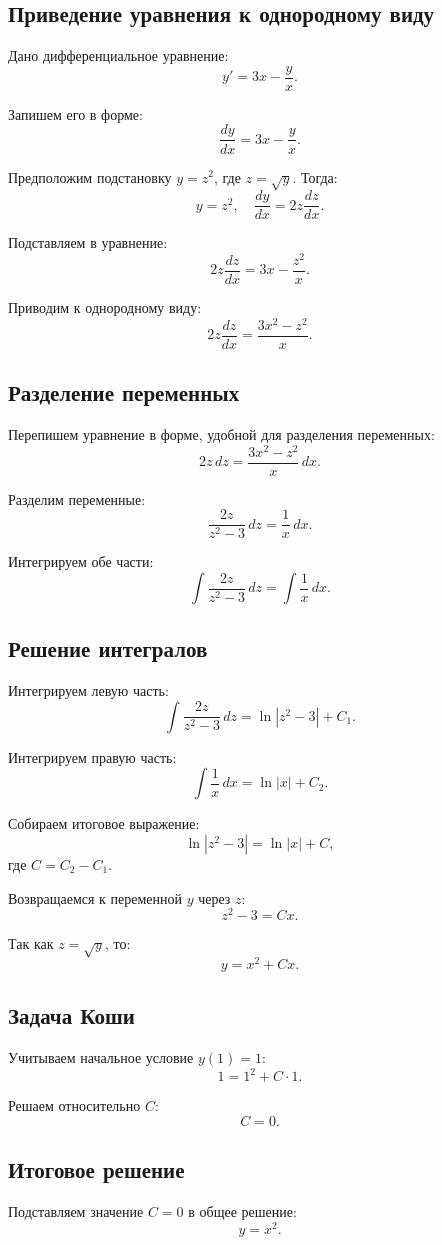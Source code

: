 \documentclass[a4paper,12pt]{article}
\begin{document}
\subsection*{Приведение уравнения к однородному виду}
Дано дифференциальное уравнение:
\[
y' = 3x - \frac{y}{x}.
\]

Запишем его в форме:
\[
\frac{dy}{dx} = 3x - \frac{y}{x}.
\]

Предположим подстановку \( y = z^2 \), где \( z = \sqrt{y} \). Тогда:
\[
y = z^2, \quad \frac{dy}{dx} = 2z \frac{dz}{dx}.
\]

Подставляем в уравнение:
\[
2z \frac{dz}{dx} = 3x - \frac{z^2}{x}.
\]

Приводим к однородному виду:
\[
2z \frac{dz}{dx} = \frac{3x^2 - z^2}{x}.
\]

\subsection*{Разделение переменных}
Перепишем уравнение в форме, удобной для разделения переменных:
\[
2z \, dz = \frac{3x^2 - z^2}{x} \, dx.
\]

Разделим переменные:
\[
\frac{2z}{z^2 - 3} \, dz = \frac{1}{x} \, dx.
\]

Интегрируем обе части:
\[
\int \frac{2z}{z^2 - 3} \, dz = \int \frac{1}{x} \, dx.
\]

\subsection*{Решение интегралов}
Интегрируем левую часть:
\[
\int \frac{2z}{z^2 - 3} \, dz = \ln|z^2 - 3| + C_1.
\]

Интегрируем правую часть:
\[
\int \frac{1}{x} \, dx = \ln|x| + C_2.
\]

Собираем итоговое выражение:
\[
\ln|z^2 - 3| = \ln|x| + C,
\]
где \( C = C_2 - C_1 \).

Возвращаемся к переменной \( y \) через \( z \):
\[
z^2 - 3 = Cx.
\]

Так как \( z = \sqrt{y} \), то:
\[
y = x^2 + Cx.
\]

\subsection*{Задача Коши}
Учитываем начальное условие \( y(1) = 1 \):
\[
1 = 1^2 + C \cdot 1.
\]

Решаем относительно \( C \):
\[
C = 0.
\]

\subsection*{Итоговое решение}
Подставляем значение \( C = 0 \) в общее решение:
\[
y = x^2.
\]
\end{document}
